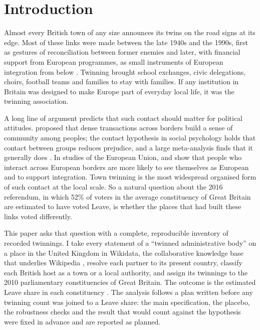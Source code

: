 \documentclass[11pt,a4paper]{article}
\begin{document}
\section{Introduction}
Almost every British town of any size announces its twins on the road signs at its edge. Most of these links were made between the late 1940s and the 1990s, first as gestures of reconciliation between former enemies and later, with financial support from European programmes, as small instruments of European integration from below \citep{vion2002,clarke2010,falkenhain2012}. Twinning brought school exchanges, civic delegations, choirs, football teams and families to stay with families. If any institution in Britain was designed to make Europe part of everyday local life, it was the twinning association.

A long line of argument predicts that such contact should matter for political attitudes. \citet{deutsch1957} proposed that dense transactions across borders build a sense of community among peoples; the contact hypothesis in social psychology holds that contact between groups reduces prejudice, and a large meta-analysis finds that it generally does \citep{pettigrew2006}. In studies of the European Union, \citet{fligstein2008} and \citet{kuhn2011,kuhn2015} show that people who interact across European borders are more likely to see themselves as European and to support integration. Town twinning is the most widespread organised form of such contact at the local scale. So a natural question about the 2016 referendum, in which 52\% of voters in the average constituency of Great Britain are estimated to have voted Leave, is whether the places that had built these links voted differently.

This paper asks that question with a complete, reproducible inventory of recorded twinnings. I take every statement of a ``twinned administrative body'' on a place in the United Kingdom in Wikidata, the collaborative knowledge base that underlies Wikipedia \citep{vrandecic2014}, resolve each partner to its present country, classify each British host as a town or a local authority, and assign its twinnings to the 2010 parliamentary constituencies of Great Britain. The outcome is the estimated Leave share in each constituency \citep{hanretty2017}. The analysis follows a plan written before any twinning count was joined to a Leave share: the main specification, the placebo, the robustness checks and the result that would count against the hypothesis were fixed in advance and are reported as planned.
\end{document}
